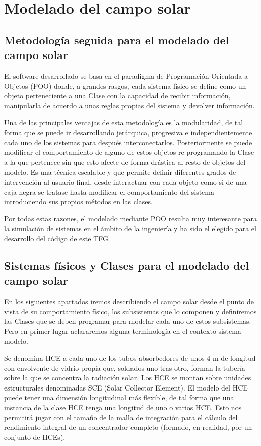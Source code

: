 \chapter{Modelado del campo solar}
\label{modeladodelcamposolar}

\section{Metodología seguida para el modelado del campo solar}

El software desarrollado se basa en el paradigma de Programación Orientada a Objetos (POO) donde, a grandes rasgos, cada sistema físico se define como un objeto perteneciente a una Clase con la capacidad de recibir información, manipularla de acuerdo a unas reglas propias del sistema y devolver información.

Una de las principales ventajas de esta metodología es la modularidad, de tal forma que se puede ir desarrollando jerárquica, progresiva e independientemente cada uno de los sistemas para después interconectarlos. Posteriormente se puede modificar el comportamiento de alguno de estos objetos re-programando la Clase a la que pertenece sin que esto afecte de forma drástica al resto de objetos del modelo. Es una técnica escalable y que permite definir diferentes grados de intervención al usuario final, desde interactuar con cada objeto como si de una caja negra se tratase hasta modificar el comportamiento del sistema introduciendo sus propios métodos en las clases.

Por todas estas razones, el modelado mediante POO resulta muy interesante para la simulación de sistemas en el ámbito de la ingeniería y ha sido el elegido para el desarrollo del código de este TFG 

\section{Sistemas físicos y Clases para el modelado del campo solar}

En los siguientes apartados iremos describiendo el campo solar desde el punto de vista de su comportamiento físico, los subsistemas que lo componen y definiremos las Clases que se deben programar para modelar cada uno de estos subsistemas. Pero en primer lugar aclararemos alguna terminología en el contexto sistema-modelo.

Se denomina HCE a cada uno de los tubos absorbedores de unos 4 m de longitud con envolvente de vidrio propia que, soldados uno tras otro, forman la tubería sobre la que se concentra la radiación solar. Los HCE  se montan sobre unidades estructurales denominadas SCE (Solar Collector Element).  El modelo del HCE puede tener una dimensión longitudinal más flexible, de tal forma que una instancia de la clase HCE tenga una longitud de uno o varios HCE. Esto nos permitirá jugar con el tamaño de la malla de integración para el cálculo del rendimiento integral de un concentrador completo (formado, en realidad, por un conjunto de HCEs).

